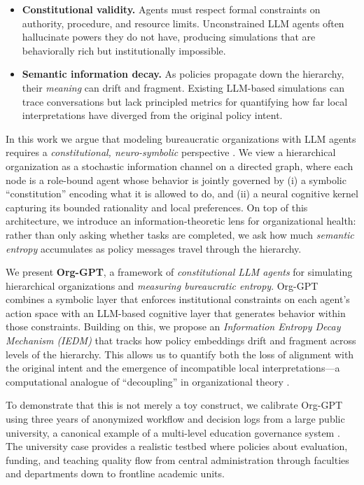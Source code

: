 \documentclass{article}
\begin{document}
\begin{itemize}
    \item \textbf{Constitutional validity.} 
    Agents must respect formal constraints on authority, procedure, and resource limits. 
    Unconstrained LLM agents often hallucinate powers they do not have, producing simulations that are behaviorally rich but institutionally impossible.
    \item \textbf{Semantic information decay.} 
    As policies propagate down the hierarchy, their \emph{meaning} can drift and fragment. 
    Existing LLM-based simulations can trace conversations but lack principled metrics for quantifying how far local interpretations have diverged from the original policy intent.
\end{itemize}

In this work we argue that modeling bureaucratic organizations with LLM agents requires a \emph{constitutional, neuro-symbolic} perspective \citep{garcez2023neurosymbolic,hitzler2022nesy_book,bengio2019system}. 
We view a hierarchical organization as a stochastic information channel on a directed graph, where each node is a role-bound agent whose behavior is jointly governed by (i) a symbolic ``constitution'' encoding what it is allowed to do, and (ii) a neural cognitive kernel capturing its bounded rationality and local preferences. 
On top of this architecture, we introduce an information-theoretic lens for organizational health: rather than only asking whether tasks are completed, we ask how much \emph{semantic entropy} accumulates as policy messages travel through the hierarchy.

We present \textbf{Org-GPT}, a framework of \emph{constitutional LLM agents} for simulating hierarchical organizations and \emph{measuring bureaucratic entropy}. 
Org-GPT combines a symbolic layer that enforces institutional constraints on each agent's action space with an LLM-based cognitive layer that generates behavior within those constraints. 
Building on this, we propose an \emph{Information Entropy Decay Mechanism (IEDM)} that tracks how policy embeddings drift and fragment across levels of the hierarchy. 
This allows us to quantify both the loss of alignment with the original intent and the emergence of incompatible local interpretations---a computational analogue of ``decoupling'' in organizational theory \citep{meyer1977institutionalized}.

To demonstrate that this is not merely a toy construct, we calibrate Org-GPT using three years of anonymized workflow and decision logs from a large public university, a canonical example of a multi-level education governance system \citep{zhang2023computational,yang2022digital}. 
The university case provides a realistic testbed where policies about evaluation, funding, and teaching quality flow from central administration through faculties and departments down to frontline academic units.
\end{document}
